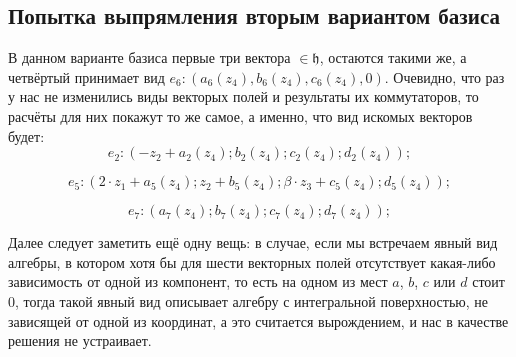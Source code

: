 \documentclass[a4paper]{article}
\begin{document}
\subsection{Попытка выпрямления вторым вариантом базиса}
В данном варианте базиса первые три вектора $\in \mathfrak{h}$, остаются такими же, а четвёртый принимает вид $e_{6}:(a_{6}(z_{4}), b_{6}(z_{4}),c_{6}(z_{4}), 0)$. Очевидно, что раз у нас не изменились виды векторых полей и результаты их коммутаторов, то расчёты для них покажут то же самое, а именно, что вид искомых векторов будет:
\begin{equation}
e_{2}:(-z_{2} + a_{2}(z_{4}) ; b_{2}(z_{4}) ; c_{2}(z_{4}) ; d_{2}(z_{4}));
\end{equation}

\begin{equation}
e_{5}:(2\cdot z_{1} + a_{5}(z_{4})  ; z_{2} + b_{5}(z_{4})  ; \beta \cdot z_{3} + c_{5}(z_{4})  ; d_{5}(z_{4}));
\end{equation}

\begin{equation}
e_{7}:( a_{7}(z_{4}) ; b_{7}(z_{4}) ; c_{7}(z_{4}) ; d_{7}(z_{4}));
\end{equation}

Далее следует заметить ещё одну вещь: в случае, если мы встречаем явный вид алгебры, в котором хотя бы для шести векторных полей отсутствует какая-либо зависимость от одной из компонент, то есть на одном из мест $a$, $b$, $c$ или $d$ стоит $0$, тогда такой явный вид описывает алгебру с интегральной поверхностью, не зависящей от одной из координат, а это считается вырождением, и нас в качестве решения не устраивает.
\end{document}
